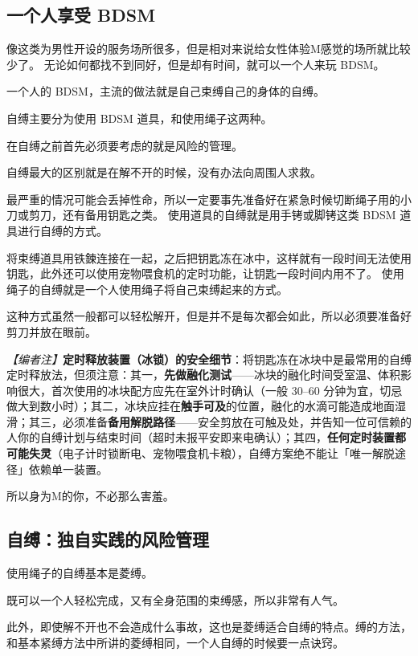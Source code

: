 \documentclass[12pt,UTF8]{ctexbook}
\begin{document}
\subsection{一个人享受 BDSM}

像这类为男性开设的服务场所很多，但是相对来说给女性体验M感觉的场所就比较少了。 无论如何都找不到同好，但是却有时间，就可以一个人来玩 BDSM。

一个人的 BDSM，主流的做法就是自己束缚自己的身体的自缚。

自缚主要分为使用 BDSM 道具，和使用绳子这两种。

在自缚之前首先必须要考虑的就是风险的管理。

自缚最大的区别就是在解不开的时候，没有办法向周围人求救。

最严重的情况可能会丢掉性命，所以一定要事先准备好在紧急时候切断绳子用的小刀或剪刀，还有备用钥匙之类。 使用道具的自缚就是用手铐或脚铐这类 BDSM 道具进行自缚的方式。

将束缚道具用铁鍊连接在一起，之后把钥匙冻在冰中，这样就有一段时间无法使用钥匙，此外还可以使用宠物喂食机的定时功能，让钥匙一段时间内用不了。 使用绳子的自缚就是一个人使用绳子将自己束缚起来的方式。

这种方式虽然一般都可以轻松解开，但是并不是每次都会如此，所以必须要准备好剪刀并放在眼前。

\noindent\textit{【编者注】}\textbf{定时释放装置（冰锁）的安全细节}：将钥匙冻在冰块中是最常用的自缚定时释放法，但须注意：其一，\textbf{先做融化测试}——冰块的融化时间受室温、体积影响很大，首次使用的冰块配方应先在室外计时确认（一般 30--60 分钟为宜，切忌做大到数小时）；其二，冰块应挂在\textbf{触手可及}的位置，融化的水滴可能造成地面湿滑；其三，必须准备\textbf{备用解脱路径}——安全剪放在可触及处，并告知一位可信赖的人你的自缚计划与结束时间（超时未报平安即来电确认）；其四，\textbf{任何定时装置都可能失灵}（电子计时锁断电、宠物喂食机卡粮），自缚方案绝不能让「唯一解脱途径」依赖单一装置。

所以身为M的你，不必那么害羞。

\subsection{自缚：独自实践的风险管理}

使用绳子的自缚基本是菱缚。

既可以一个人轻松完成，又有全身范围的束缚感，所以非常有人气。

此外，即使解不开也不会造成什么事故，这也是菱缚适合自缚的特点。缚的方法，和基本紧缚方法中所讲的菱缚相同，一个人自缚的时候要一点诀窍。
\end{document}
